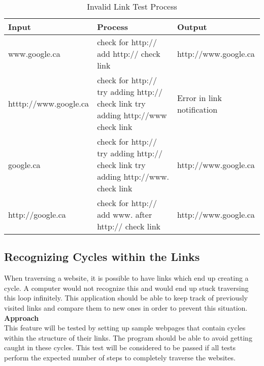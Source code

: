 \documentclass[12pt, titlepage]{article}
\begin{document}
\begin{table}[h!]
	\begin{tabular}{| p{5cm} | p{5cm} | p{5cm} |}    \hline
	Input  &Process &Output\\ \hline
	www.google.ca &check for http:// \newline add http:// \newline check link &http://www.google.ca\\ \hline
	htttp://www.google.ca &check for http:// \newline try adding http:// \newline check link \newline try adding http://www \newline check link &Error in link notification\\ \hline
	google.ca &check for http:// \newline try adding http:// \newline check link \newline try adding http://www. \newline check link &http://www.google.ca \\ \hline
	http://google.ca &check for http:// \newline add www. after http:// \newline check link &http://www.google.ca \\ \hline
	\end{tabular}
       
       \caption{Invalid Link Test Process}
       \label{table:Invalid Link Test Process}
\end{table}

\subsection{Recognizing Cycles within the Links}
When traversing a website, it is possible to have links which end up creating a cycle. A computer would not recognize this and would end up stuck traversing this loop infinitely. This application should be able to keep track of previously visited links and compare them to new ones in order to prevent this situation.\\

\textbf{Approach}\\
This feature will be tested by setting up sample webpages that contain cycles within the structure of their links. The program should be able to avoid getting caught in these cycles. This test will be considered to be passed if all tests perform the expected number of steps to completely traverse the websites.\\
\end{document}
